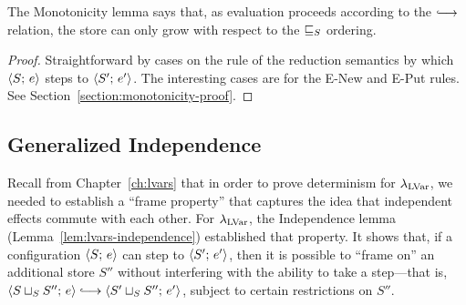 The Monotonicity lemma says that, as evaluation proceeds according to
the $\parstepsto$ relation, the store can only grow with respect to
the $ \sqsubseteq_S $ ordering.

\LemMonotonicity
\begin{proof}
  Straightforward by cases on the rule of the reduction semantics by
  which $\langle S;\, e \rangle$ steps to $\langle S';\, e' \rangle$. The interesting
  cases are for the {\sc E-New} and {\sc E-Put} rules.  See
  Section~\ref{section:monotonicity-proof}.
\end{proof}

\subsection{Generalized Independence}\label{subsection:quasi-generalized-independence}

Recall from Chapter~\ref{ch:lvars} that in order to prove determinism
for $\lambda_{\textrm{LVar}}$, we needed to establish a ``frame property'' that
captures the idea that independent effects commute with each other.
For $\lambda_{\textrm{LVar}}$, the Independence lemma
(Lemma~\ref{lem:lvars-independence}) established that property.  It
shows that, if a configuration $\langle S;\, e \rangle$ can step to
$\langle S';\, e' \rangle$, then it is possible to ``frame on'' an additional
store $S''$ without interfering with the ability to take a step---that
is, $\config{\lubstore{S}{S''}}{e} \parstepsto
\config{\lubstore{S'}{S''}}{e'}$, subject to certain restrictions on
$S''$.

